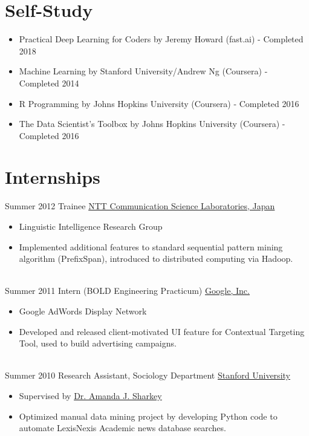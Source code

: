 \documentclass[letterpaper]{twentysecondcv} %
\begin{document}
\section{Self-Study}
\begin{itemize} \itemsep -2pt %
        \item Practical Deep Learning for Coders by Jeremy Howard (fast.ai) - Completed 2018
        \item Machine Learning by Stanford University/Andrew Ng (Coursera) - Completed 2014
       	\item R Programming by Johns Hopkins University (Coursera) - Completed 2016
        \item The Data Scientist's Toolbox by Johns Hopkins University (Coursera) - Completed 2016
\end{itemize}


\section{Internships}
\begin{twenty}
	\twentyitem
    	{Summer}
        {2012}
        {Trainee}
        {\href{http://www.kecl.ntt.co.jp/rps/index.html}{NTT Communication Science Laboratories, Japan}}
        {}
        {\begin{itemize} \itemsep -2pt %
        \item Linguistic Intelligence Research Group
       	\item Implemented additional features to standard sequential pattern mining algorithm (PrefixSpan), introduced to distributed computing via Hadoop.
        \end{itemize}}
    \\
    \twentyitem
    	{Summer}
        {2011}
        {Intern (BOLD Engineering Practicum)}
        {\href{https://careers.google.com/students/}{Google, Inc.}}
        {}
        {\begin{itemize}  \itemsep -2pt %
        \item Google AdWords Display Network
        \item Developed and released client-motivated UI feature for Contextual Targeting Tool,
            used to build advertising campaigns.
        \end{itemize}}
    \\
    \twentyitem
    	{Summer}
        {2010}
        {Research Assistant, Sociology Department}
        {\href{https://careers.google.com/students/}{Stanford University}}
        {}
        {\begin{itemize}  \itemsep -2pt %
        \item Supervised by \href{https://www.chicagobooth.edu/faculty/directory/s/amanda-j-sharkey}{Dr. Amanda J. Sharkey}
        \item Optimized manual data mining project by developing Python code to automate
            LexisNexis Academic news database searches.
        \end{itemize} }
\end{twenty}
\end{document}
